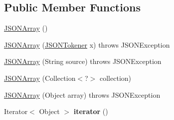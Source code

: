 \subsection*{Public Member Functions}
\begin{DoxyCompactItemize}
\item 
\hyperlink{classorg_1_1json_1_1JSONArray_abf6f4be98df2bcc1fa7e08881bf1accd}{J\-S\-O\-N\-Array} ()
\item 
\hyperlink{classorg_1_1json_1_1JSONArray_a9e8972d5f64b8fc6b7fca9169d29421a}{J\-S\-O\-N\-Array} (\hyperlink{classorg_1_1json_1_1JSONTokener}{J\-S\-O\-N\-Tokener} x)  throws J\-S\-O\-N\-Exception 
\item 
\hyperlink{classorg_1_1json_1_1JSONArray_a62861e8a8afbae3fd6b637aeb444b2d4}{J\-S\-O\-N\-Array} (String source)  throws J\-S\-O\-N\-Exception 
\item 
\hyperlink{classorg_1_1json_1_1JSONArray_a505a06836395ebc2460da84902b1b645}{J\-S\-O\-N\-Array} (Collection$<$?$>$ collection)
\item 
\hyperlink{classorg_1_1json_1_1JSONArray_a22e9287f807d9846f4cb7d4bd300f2eb}{J\-S\-O\-N\-Array} (Object array)  throws J\-S\-O\-N\-Exception 
\item 
\hypertarget{classorg_1_1json_1_1JSONArray_a606636d5a55ac4d0783ac5308cdd6e19}{Iterator$<$ Object $>$ {\bfseries iterator} ()}\label{classorg_1_1json_1_1JSONArray_a606636d5a55ac4d0783ac5308cdd6e19}


\end{DoxyCompactItemize}
